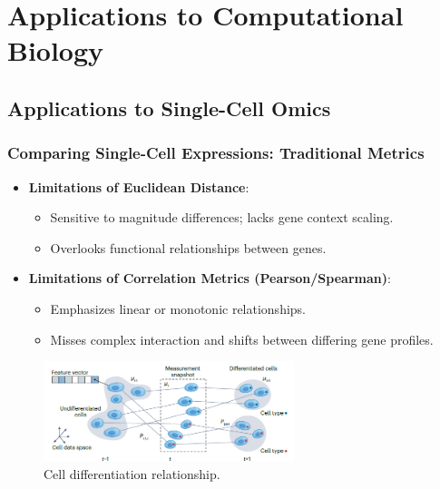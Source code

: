 \documentclass{beamer}
\begin{document}
	\section{Applications to Computational Biology}
	
	\subsection{Applications to Single-Cell Omics}
	\begin{frame}
		\frametitle{Comparing Single-Cell Expressions: Traditional Metrics}
		\begin{itemize}
			\item \textbf{Limitations of Euclidean Distance}:
			\begin{itemize}
				\item Sensitive to magnitude differences; lacks gene context scaling.
				\item Overlooks functional relationships between genes.
			\end{itemize}
			
			\item \textbf{Limitations of Correlation Metrics (Pearson/Spearman)}:
			\begin{itemize}
				\item Emphasizes linear or monotonic relationships.
				\item Misses complex interaction and shifts between differing gene profiles.
			\end{itemize}
		\end{itemize}
		\begin{figure}
			\includegraphics[width=0.65\textwidth]{cell_differentiation.png}
			\caption{Cell differentiation relationship. \cite{bunne2024optimal}}
		\end{figure}
	\end{frame}
	
	
		
\end{document}
